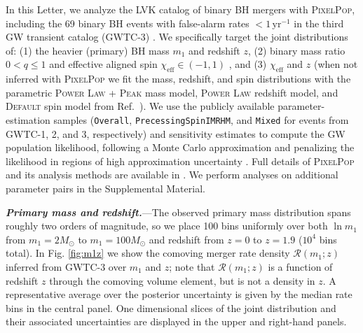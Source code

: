 \documentclass[%
 reprint,
 amsmath,amssymb,
 aps,
 prl,
 nofootinbib,nobibnotes,
]{revtex4-2}
\newcommand{\heading}[1]{\textbf{\textit{#1.}}}
\begin{document}
In this Letter, we analyze the LVK catalog of binary BH mergers with \textsc{PixelPop}, including the 69 binary BH events with false-alarm rates $<1\,\mathrm{yr}^{-1}$ in the third GW transient catalog (GWTC-3) \cite{LIGOScientific:2021djp, KAGRA:2021duu}. We specifically target the joint distributions of: (1) the heavier (primary) BH mass $m_1$ and redshift $z$, (2) binary mass ratio $0<q\leq1$ and effective aligned spin $\chi_\mathrm{eff}\in(-1,1)$ \cite{Racine:2008qv}, and (3) $\chi_\mathrm{eff}$ and $z$ (when not inferred with \textsc{PixelPop} we fit the mass, redshift, and spin distributions with the parametric \textsc{Power Law + Peak} mass model, \textsc{Power Law} redshift model, and \textsc{Default} spin model from Ref.~\cite{KAGRA:2021duu}). We use the publicly available \cite{LIGOScientific:2019lzm, KAGRA:2023pio} parameter-estimation samples \cite{gwtc1_pe, gwtc2_pe, ligo_scientific_collaboration_and_virgo_2022_6513631, ligo_scientific_collaboration_and_virgo_2023_8177023} (\texttt{Overall}, \texttt{PrecessingSpinIMRHM}, and \texttt{Mixed} for events from GWTC-1, 2, and 3, respectively) and sensitivity estimates \cite{ligo_scientific_collaboration_and_virgo_2023_7890398} to compute the GW population likelihood, following a Monte Carlo approximation \cite{Thrane:2018qnx, Vitale2020, KAGRA:2021duu} and penalizing the likelihood in regions of high approximation uncertainty \cite{Farr:2019rap, Essick:2022ojx, Talbot:2023pex}. Full details of \textsc{PixelPop} and its analysis methods are available in \citeauthor{Heinzel:2024jlc} \cite{Heinzel:2024jlc}. We perform analyses on additional parameter pairs in the Supplemental Material.

\heading{Primary mass and redshift}---The observed primary mass distribution spans roughly two orders of magnitude, so we place 100 bins uniformly over both $\ln m_1$ from $m_1=2M_\odot$ to $m_1=100M_\odot$ and redshift from $z=0$ to $z=1.9$ ($10^4$ bins total). In Fig. \ref{fig:m1z} we show the comoving merger rate density $\mathcal{R}(m_1;z)$ inferred from GWTC-3 over $m_1$ and $z$; note that $\mathcal{R}(m_1;z)$ is a function of redshift $z$ through the comoving volume element, but is not a density in $z$. A representative average over the posterior uncertainty is given by the median rate bins in the central panel. One dimensional slices of the joint distribution and their associated uncertainties are displayed in the upper and right-hand panels.
\end{document}
